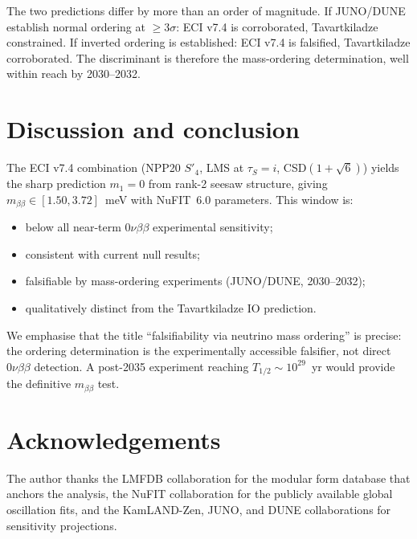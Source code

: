 \documentclass[aps,prl,twocolumn,showpacs,superscriptaddress]{revtex4-2}
\newcommand{\mbb}{m_{\beta\beta}}
\begin{document}
The two predictions differ by more than an order of magnitude.
If JUNO/DUNE establish normal ordering at $\geq3\sigma$: ECI v7.4
is corroborated, Tavartkiladze constrained.
If inverted ordering is established: ECI v7.4 is falsified,
Tavartkiladze corroborated.  The discriminant is therefore the
mass-ordering determination, well within reach by 2030--2032.

\section{Discussion and conclusion}
\label{sec:concl}

The ECI v7.4 combination (NPP20 $S'_4$, LMS at $\tau_S=i$,
CSD$(1+\sqrt{6})$) yields the sharp prediction $m_1=0$ from
rank-2 seesaw structure, giving $\mbb\in[1.50,3.72]$~meV
with NuFIT~6.0 parameters.  This window is:
\begin{itemize}
\item below all near-term $0\nu\beta\beta$ experimental sensitivity;
\item consistent with current null results;
\item falsifiable by mass-ordering experiments (JUNO/DUNE, 2030--2032);
\item qualitatively distinct from the Tavartkiladze IO prediction.
\end{itemize}

We emphasise that the title ``falsifiability via neutrino mass
ordering'' is precise: the ordering determination is the
experimentally accessible falsifier, not direct $0\nu\beta\beta$
detection.  A post-2035 experiment reaching $T_{1/2}\sim10^{29}$~yr
would provide the definitive $\mbb$ test.

\section*{Acknowledgements}

The author thanks the LMFDB collaboration for the modular form database
that anchors the analysis, the NuFIT collaboration for the publicly
available global oscillation fits, and the KamLAND-Zen, JUNO, and
DUNE collaborations for sensitivity projections.
\end{document}
